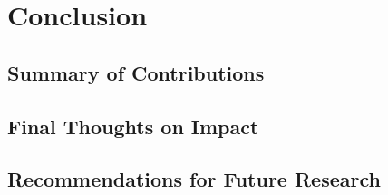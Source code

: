 \chapter{Conclusion}


\section{Summary of Contributions}

\section{Final Thoughts on Impact}

\section{Recommendations for Future Research}